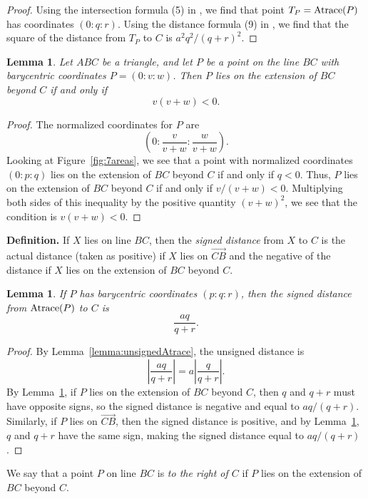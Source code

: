\documentclass[12pt,a4paper]{amsart}
\newtheorem{lemma}[theorem]{Lemma}
\begin{document}
\begin{proof}
Using the intersection formula (5) in \cite{Grozdev}, we find that point $T_P=\hbox{Atrace}(P)$
has coordinates $(0:q:r)$. Using the distance formula (9) in  \cite{Grozdev}, we find that
the square of the distance from $T_P$ to $C$ is $a^2q^2/(q+r)^2$.
\end{proof}

\begin{lemma}
\label{lemma:right}
Let $ABC$ be a triangle, and let $P$ be a point on the line $BC$ with barycentric coordinates
$P=(0:v:w)$.
Then $P$ lies on the extension of $BC$ beyond $C$ if and only if
$$v(v+w)<0.$$
\end{lemma}

\begin{proof}
The normalized coordinates for $P$ are
$$\left(0:\frac{v}{v+w}:\frac{w}{v+w}\right).$$
Looking at Figure~\ref{fig:7areas}, we see that a point with normalized coordinates $(0:p:q)$
lies on the extension of $BC$ beyond $C$ if and only if $q<0$.
Thus, $P$ lies on the extension of $BC$ beyond $C$ if and only if $v/(v+w)<0$.
Multiplying both sides of this inequality by the positive quantity $(v+w)^2$, we see
that the condition is $v(v+w)<0$.
\end{proof}

\textbf{Definition.} If $X$ lies on line $BC$, then the \emph{signed distance} from $X$ to $C$
is the actual distance (taken as positive) if $X$ lies on $\overrightarrow{CB}$ and the negative of the distance
if $X$ lies on the extension of $BC$ beyond $C$.

\begin{lemma}
\label{lemma:signedAtrace}
If $P$ has barycentric coordinates $(p:q:r)$, then the signed distance from $\hbox{Atrace}(P)$ to $C$ is
$$\frac{aq}{q+r}.$$
\end{lemma}

\begin{proof}
By Lemma~\ref{lemma:unsignedAtrace}, the unsigned distance is 
$$\left|\frac{aq}{q+r}\right|=a\left|\frac{q}{q+r}\right|.$$
By Lemma~\ref{lemma:right}, if $P$ lies on the extension of $BC$ beyond $C$,
then $q$ and $q+r$ must have opposite signs, so the signed distance is negative and
equal to $aq/(q+r)$. Similarly, if $P$ lies on $\overrightarrow{CB}$, then the signed distance
is positive, and by Lemma~\ref{lemma:right}, $q$ and $q+r$ have the same sign, making
the signed distance equal to $aq/(q+r)$.
\end{proof}

We say that a point $P$ on line $BC$ is \emph{to the right of $C$} if
$P$ lies on the extension of $BC$ beyond $C$.
\end{document}

